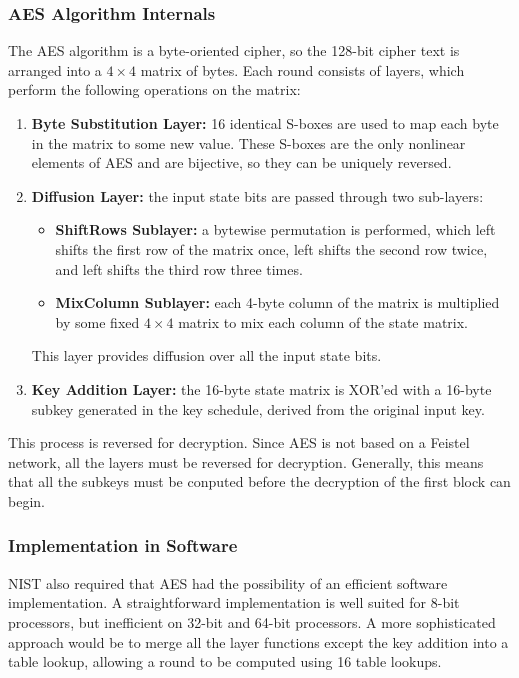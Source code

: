 \documentclass{math}
\begin{document}
\subsubsection*{AES Algorithm Internals}
The AES algorithm is a byte-oriented cipher, so the 128-bit cipher text is
arranged into a \( 4\times4 \) matrix of bytes. Each round consists of layers,
which perform the following operations on the matrix:
\begin{enumerate}
  \item \textbf{Byte Substitution Layer:} 16 identical S-boxes are used to map
  each byte in the matrix to some new value. These S-boxes are the only
  nonlinear elements of AES and are bijective, so they can be uniquely reversed.
  \item \textbf{Diffusion Layer:} the input state bits are passed through two
  sub-layers:
  \begin{itemize}
    \item \textbf{ShiftRows Sublayer:} a bytewise permutation is performed,
    which left shifts the first row of the matrix once, left shifts the second
    row twice, and left shifts the third row three times.
    \item \textbf{MixColumn Sublayer:} each 4-byte column of the matrix is
    multiplied by some fixed \( 4\times4 \) matrix to mix each column of the
    state matrix.
  \end{itemize}
  This layer provides diffusion over all the input state bits.
  \item \textbf{Key Addition Layer:} the 16-byte state matrix is XOR'ed with a
  16-byte subkey generated in the key schedule, derived from the original
  input key.
\end{enumerate}
This process is reversed for decryption. Since AES is not based on a Feistel
network, all the layers must be reversed for decryption. Generally, this means
that all the subkeys must be conputed before the decryption of the first block
can begin.

\subsubsection*{Implementation in Software}
NIST also required that AES had the possibility of an efficient software
implementation. A straightforward implementation is well suited for 8-bit
processors, but inefficient on 32-bit and 64-bit processors. A more
sophisticated approach would be to merge all the layer functions except the
key addition into a table lookup, allowing a round to be computed using 16 table
lookups.
\end{document}
